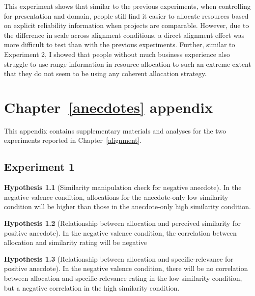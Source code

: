 \documentclass[a4paper, nobind, dvipsnames]{templates/ociamthesis}
\theoremstyle{definition}
\theoremstyle{definition}
\theoremstyle{definition}
\theoremstyle{definition}
\newtheorem{hypothesis}{Hypothesis}[chapter]
\theoremstyle{remark}
\begin{document}
This experiment shows that similar to the previous experiments, when controlling
for presentation and domain, people still find it easier to allocate resources
based on explicit reliability information when projects are comparable. However,
due to the difference in scale across alignment conditions, a direct alignment
effect was more difficult to test than with the previous experiments. Further,
similar to Experiment 2, I showed that people without much business experience
also struggle to use range information in resource allocation to such an extreme
extent that they do not seem to be using any coherent allocation strategy.

\hypertarget{anecdotes-appendix}{%
\chapter{Chapter~\ref{anecdotes} appendix}\label{anecdotes-appendix}}

\minitoc

This appendix contains supplementary materials and analyses for the two
experiments reported in Chapter~\ref{alignment}.

\hypertarget{anecdotes-1-appendix}{%
\section{Experiment 1}\label{anecdotes-1-appendix}}

\begin{hypothesis}[Similarity manipulation check for negative anecdote]
\protect\hypertarget{hyp:similarity-check-anecdotes-1}{}{\label{hyp:similarity-check-anecdotes-1} {} }In the negative valence condition, allocations for the anecdote-only low
similarity condition will be higher than those in the anecdote-only high
similarity condition.
\end{hypothesis}

\begin{hypothesis}[Relationship between allocation and perceived similarity for positive anecdote]
\protect\hypertarget{hyp:allocation-similarity-anecdotes-1}{}{\label{hyp:allocation-similarity-anecdotes-1} {} }In the negative valence condition, the correlation between allocation and
similarity rating will be negative
\end{hypothesis}

\begin{hypothesis}[Relationship between allocation and specific-relevance for positive anecdote]
\protect\hypertarget{hyp:allocation-specific-relevance-anecdotes-1}{}{\label{hyp:allocation-specific-relevance-anecdotes-1} {} }In the negative valence condition, there will be no correlation between
allocation and specific-relevance rating in the low similarity condition, but a
negative correlation in the high similarity condition.
\end{hypothesis}
\end{document}
